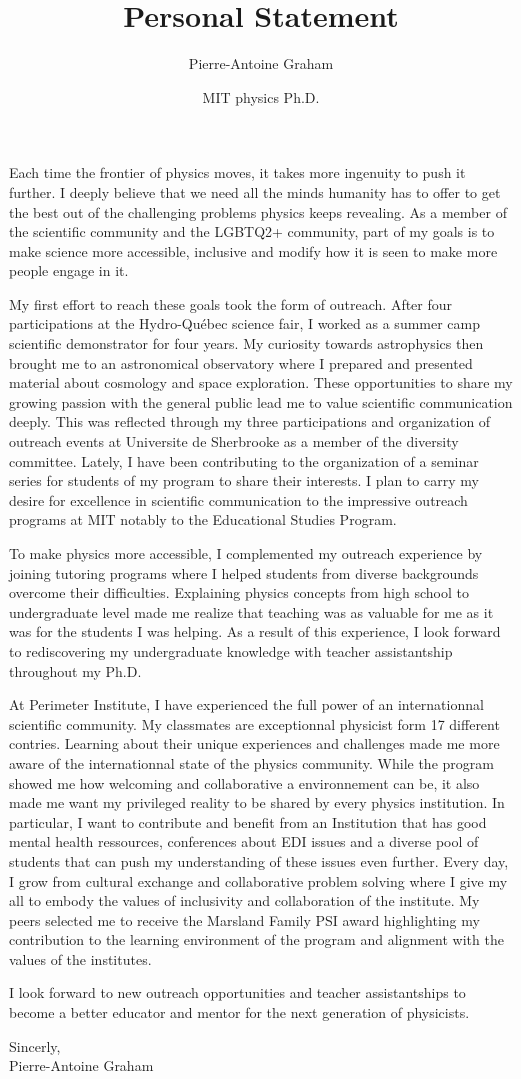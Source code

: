 \documentclass[12pt]{article}
\title{Personal Statement}
\author{Pierre-Antoine Graham}
\date{MIT physics Ph.D.}
\begin{document}
\maketitle
\vspace{0.5cm}

Each time the frontier of physics moves, it takes more ingenuity to push it further. I deeply believe that we need all the minds humanity has to offer to get the best out of the challenging problems physics keeps revealing. As a member of the scientific community and the LGBTQ2+ community, part of my goals is to make science more accessible, inclusive and modify how it is seen to make more people engage in it. 

My first effort to reach these goals took the form of outreach. After four participations at the Hydro-Québec science fair, I worked as a summer camp scientific demonstrator for four years. My curiosity towards astrophysics then brought me to an astronomical observatory where I prepared and presented material about cosmology and space exploration. These opportunities to share my growing passion with the general public lead me to value scientific communication deeply. This was reflected through my three participations and organization of outreach events at Universite de Sherbrooke as a member of the diversity committee. Lately, I have been contributing to the organization of a seminar series for students of my program to share their interests. I plan to carry my desire for excellence in scientific communication to the impressive outreach programs at MIT notably to the Educational Studies Program.

To make physics more accessible, I complemented my outreach experience by joining tutoring programs where I helped students from diverse backgrounds overcome their difficulties. Explaining physics concepts from high school to undergraduate level made me realize that teaching was as valuable for me as it was for the students I was helping. As a result of this experience, I look forward to rediscovering my undergraduate knowledge with teacher assistantship throughout my Ph.D. 

At Perimeter Institute, I have experienced the full power of an internationnal scientific community. My classmates are exceptionnal physicist form 17 different contries. Learning about their unique experiences and challenges made me more aware of the internationnal state of the physics community. While the program showed me how welcoming and collaborative a environnement can be, it also made me want my privileged reality to be shared by every physics institution. In particular, I want to contribute and benefit from an Institution that has good mental health ressources, conferences about EDI issues and a diverse pool of students that can push my understanding of these issues even further. Every day, I grow from cultural exchange and collaborative problem solving where I give my all to embody the values of inclusivity and collaboration of the institute. My peers selected me to receive the Marsland Family PSI award highlighting my contribution to the learning environment of the program and alignment with the values of the institutes.

I look forward to new outreach opportunities and teacher assistantships to become a better educator and mentor for the next generation of physicists.

Sincerly, \\

Pierre-Antoine Graham
\end{document}
